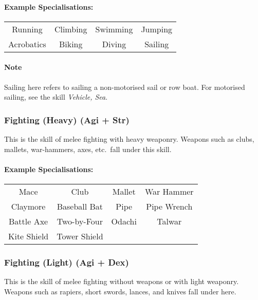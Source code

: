 \paragraph{Example Specialisations:}
\begin{center}
    \begin{tabular}{c|c|c|c}
        Running & Climbing & Swimming & Jumping \\
        Acrobatics & Biking & Diving & Sailing \\
    \end{tabular}
\end{center}

\paragraph{Note} Sailing here refers to sailing a non-motorised sail or row boat. For motorised sailing, see the skill \textit{Vehicle, Sea}.

\subsubsection{Fighting (Heavy) (Agi + Str)}
This is the skill of melee fighting with heavy weaponry. Weapons such as clubs, mallets, war-hammers, axes, etc.\ fall under this skill.

\paragraph{Example Specialisations:}
\begin{center}
    \begin{tabular}{c|c|c|c}
        Mace & Club & Mallet & War Hammer \\
        Claymore & Baseball Bat & Pipe & Pipe Wrench \\
        Battle Axe & Two-by-Four & Odachi & Talwar \\
        Kite Shield & Tower Shield \\
    \end{tabular}
\end{center}

\subsubsection{Fighting (Light) (Agi + Dex)}
This is the skill of melee fighting without weapons or with light weaponry. 
Weapons such as rapiers, short swords, lances, and knives fall under here.

